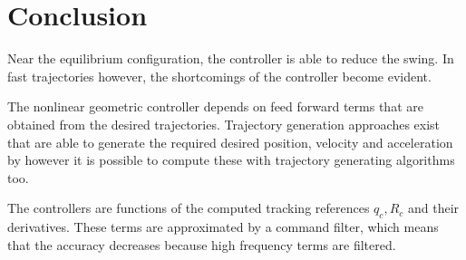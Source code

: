 \newpage
\section{Conclusion}\label{set:set.con}

Near the equilibrium configuration, the  controller is able to reduce the swing. In fast trajectories however, the shortcomings of the  controller become evident. 

The nonlinear geometric controller depends on feed forward terms that are obtained from the desired trajectories. 
Trajectory generation approaches exist that are able to generate the required desired position, velocity and acceleration by 
however it is possible to compute these with trajectory generating algorithms too.

The controllers are functions of the computed tracking references $ q_c, R_c $ and their derivatives. These terms are approximated by a command filter, which means that the accuracy decreases because high frequency terms are filtered.

